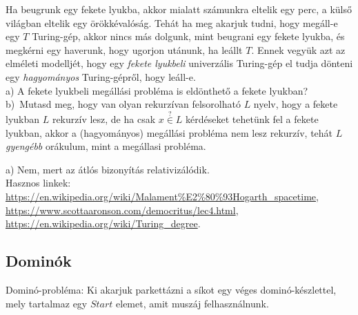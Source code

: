 \begin{Exercise}[counter={sorszam}, difficulty=0]
	Ha beugrunk egy fekete lyukba, akkor mialatt sz\'amunkra eltelik egy perc, a k\"uls\H o vil\'agban eltelik egy \"or\"okk\'eval\'os\'ag. Teh\'at ha meg akarjuk tudni, hogy meg\'all-e egy $T$ Turing-g\'ep, akkor nincs m\'as dolgunk, mint beugrani egy fekete lyukba, \'es megk\'erni egy haverunk, hogy ugorjon ut\'anunk, ha le\'allt $T$. Ennek vegy\"uk azt az elm\'eleti modellj\'et, hogy egy \emph{fekete lyukbeli} univerz\'alis Turing-g\'ep el tudja d\"onteni egy \emph{hagyom\'anyos} Turing-g\'epr\H ol, hogy le\'all-e.\\
	a) A fekete lyukbeli meg\'all\'asi probl\'ema is eld\"onthet\H o a fekete lyukban?\\
	b)~\veryhard Mutasd meg, hogy van olyan rekurz\'ivan felsorolhat\'o $L$ nyelv, hogy a fekete lyukban $L$ rekurz\'iv lesz, de ha csak $x \stackrel ?\in L$ k\'erd\'eseket tehet\"unk fel a fekete lyukban, akkor a (hagyom\'anyos) meg\'all\'asi probl\'ema nem lesz rekurz\'iv, teh\'at $L$ \emph{gyeng\'ebb} or\'akulum, mint a meg\'allasi probl\'ema.
\end{Exercise}	
\begin{Answer}
	a) Nem, mert az \'atl\'os bizony\'it\'as relativiz\'al\'odik.\\
	Hasznos linkek: \url{https://en.wikipedia.org/wiki/Malament%E2%80%93Hogarth_spacetime}, \url{https://www.scottaaronson.com/democritus/lec4.html}, \url{https://en.wikipedia.org/wiki/Turing_degree}.
\end{Answer}


\subsection{Domin\'ok}
\bigskip
{} Dominó-probléma: Ki akarjuk parkettázni a síkot egy véges dominó-készlettel, mely tartalmaz egy $Start$ elemet, amit muszáj felhasználnunk.


